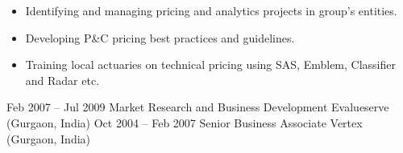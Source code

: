 \documentclass[a4paper,]{fortysecondscv}
\begin{document}
\begin{cvtable}
{        \begin{itemize}[nosep, leftmargin=0pt] %
            \item Identifying and managing pricing and analytics projects in group's entities.
            \item Developing P\&C pricing best practices and guidelines.
            \item Training local actuaries on technical pricing using SAS, Emblem, Classifier and Radar etc.
        \end{itemize}
    }
    \vspace{\topsep}
    \cvitem
    {Feb 2007 -- Jul 2009}
    {Market Research and Business Development}
    {Evalueserve (Gurgaon, India)}
    {
    }
    \vspace{\topsep}
    \cvitem
    {Oct 2004 -- Feb 2007}
    {Senior Business Associate}
    {Vertex (Gurgaon, India)}
    {
    }
\end{cvtable}





\newpage
\makebacksidebar


\end{document}
